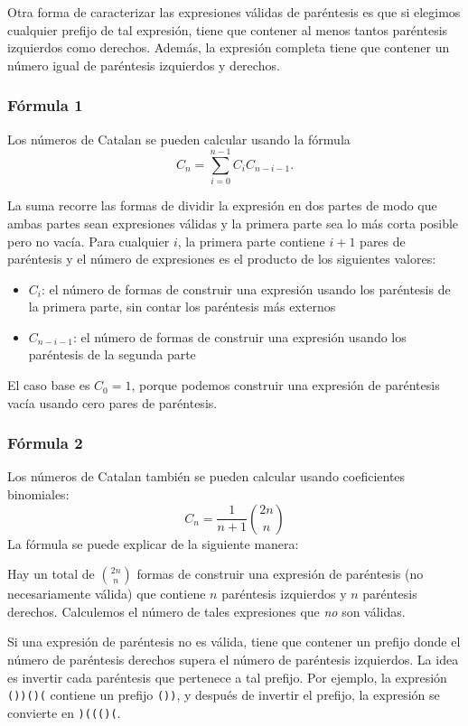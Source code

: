 Otra forma de caracterizar las expresiones válidas
de paréntesis es que si
elegimos cualquier prefijo de tal expresión,
tiene que contener al menos tantos paréntesis
izquierdos como derechos.
Además, la expresión completa tiene que
contener un número igual de paréntesis izquierdos y
derechos.

\subsubsection{Fórmula 1}

Los números de Catalan se pueden calcular usando la fórmula
\[ C_n = \sum_{i=0}^{n-1} C_{i} C_{n-i-1}.\]

La suma recorre las formas de dividir la
expresión en dos partes
de modo que ambas partes sean expresiones
válidas y la primera parte sea lo más corta posible
pero no vacía.
Para cualquier $i$, la primera parte contiene $i+1$ pares
de paréntesis y el número de expresiones
es el producto de los siguientes valores:

\begin{itemize}
\item $C_{i}$: el número de formas de construir una expresión
usando los paréntesis de la primera parte,
sin contar los paréntesis más externos
\item $C_{n-i-1}$: el número de formas de construir una
expresión usando los paréntesis de la segunda parte
\end{itemize}

El caso base es $C_0=1$,
porque podemos construir una expresión de paréntesis
vacía usando cero pares de paréntesis.

\subsubsection{Fórmula 2}

Los números de Catalan también se pueden calcular
usando coeficientes binomiales:
\[ C_n = \frac{1}{n+1} {2n \choose n}\]
La fórmula se puede explicar de la siguiente manera:

Hay un total de ${2n \choose n}$ formas
de construir una expresión de paréntesis (no necesariamente válida)
que contiene $n$ paréntesis izquierdos y $n$ paréntesis derechos.
Calculemos el número de tales
expresiones que \emph{no} son válidas.

Si una expresión de paréntesis no es válida,
tiene que contener un prefijo donde el
número de paréntesis derechos supera el
número de paréntesis izquierdos.
La idea es invertir cada paréntesis
que pertenece a tal prefijo.
Por ejemplo, la expresión
\texttt{())()(} contiene un prefijo \texttt{())},
y después de invertir el prefijo,
la expresión se convierte en \texttt{)((()(}.

